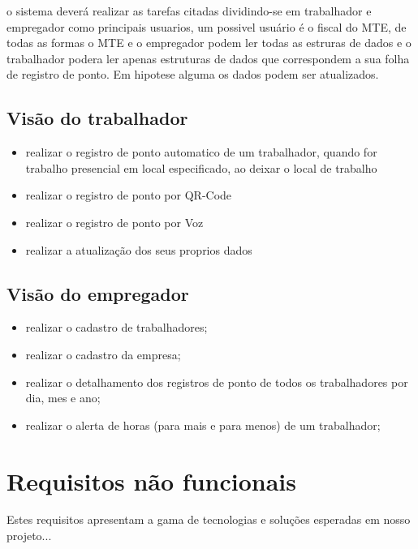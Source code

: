 \documentclass[12pt,openright,twoside,a4paper,english, brazil]{abntex2} %
\begin{document}
o sistema deverá realizar as tarefas citadas dividindo-se em trabalhador e empregador como principais usuarios, um possivel usuário é o fiscal do MTE, de todas as formas o MTE e o empregador podem ler todas as estruras de dados e o trabalhador podera ler apenas estruturas de dados que correspondem a sua folha de registro de ponto. Em hipotese alguma os dados podem ser atualizados. 


\subsection{Visão do trabalhador}

\begin{itemize}
	\item realizar o registro de ponto automatico de um trabalhador, quando for trabalho presencial em local especificado, ao deixar o local de trabalho
	\item realizar o registro de ponto por QR-Code
	\item realizar o registro de ponto por Voz
	\item realizar a atualização dos seus proprios dados
\end{itemize}

\subsection{Visão do empregador}

\begin{itemize}
	\item realizar o cadastro de trabalhadores;
	\item realizar o cadastro da empresa;
	\item realizar o detalhamento dos registros de ponto de todos os trabalhadores por dia, mes e ano;
	\item realizar o alerta de horas (para mais e para menos) de um trabalhador;
\end{itemize}

\section{Requisitos não funcionais}

Estes requisitos apresentam a gama de tecnologias e soluções esperadas em nosso projeto...
\end{document}
